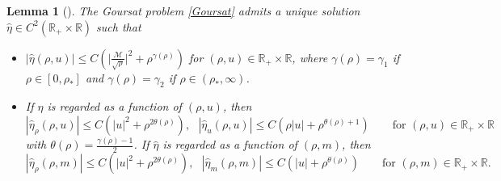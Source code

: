 \documentclass[reqno,11pt]{amsart}
\numberwithin{equation}{section}
\newtheorem{lemma}[theorem]{Lemma}
\theoremstyle{definition}
\begin{document}
\begin{lemma}[]\label{specificentropy}
    The Goursat problem \eqref{Goursat} admits a unique solution $\hat{\eta} \in C^2(\mathbb{R}_+ \times \mathbb{R})$ such that
\begin{itemize}
 \item[{\rm(a)}] $|\hat{\eta}(\rho,u)| \leq C (\big | \frac{\mathcal{M}}{\sqrt{\rho}} \big |^2 + \rho^{\gamma(\rho)})$ for $(\rho,u) \in \mathbb{R}_+ \times \mathbb{R}$, where $\gamma(\rho) = \gamma_1$ if $\rho \in [0,\rho_*]$ and $\gamma(\rho) = \gamma_2$ if $\rho \in (\rho_*,\infty)$.
\item[{\rm(b)}] If $\hat{\eta}$ is regarded as a function of $(\rho,u)$, then
  \begin{equation*}
      |\hat{\eta}_\rho(\rho,u)| \leq C (|u|^2 + \rho^{2 \theta(\rho)}), 
      \,\,\,\, |\hat{\eta}_u(\rho,u)| \leq C (\rho|u| + \rho^{\theta(\rho) + 1}) 
     \qquad\mbox{for $(\rho,u) \in \mathbb{R}_+ \times \mathbb{R}$} 
\end{equation*}
    with $\theta(\rho) = \frac{\gamma(\rho) - 1}{2}$. 
    If $\hat{\eta}$ is regarded as a function of $(\rho,m)$, then
 \begin{equation*}
      |\hat{\eta}_\rho(\rho,m)| \leq C (|u|^2 + \rho^{2 \theta(\rho)}), 
     \,\,\,\, |\hat{\eta}_m(\rho,m)| \leq C (|u| + \rho^{\theta(\rho)})\qquad\mbox{for $(\rho,m) \in \mathbb{R}_+ \times \mathbb{R}$}.
       \end{equation*} 
              

\end{itemize}
\end{lemma}
\end{document}
